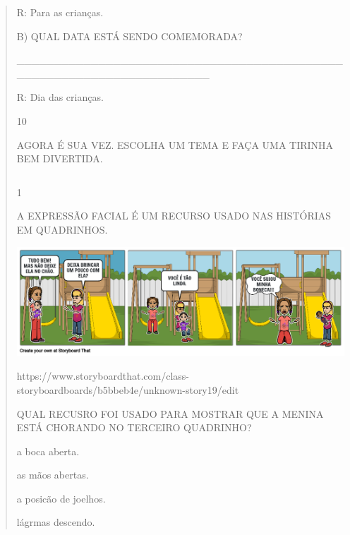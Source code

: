 \begin{verse}
{{{R: Para as crianças.

B) QUAL DATA ESTÁ SENDO COMEMORADA?

\_\_\_\_\_\_\_\_\_\_\_\_\_\_\_\_\_\_\_\_\_\_\_\_\_\_\_\_\_\_\_\_\_\_\_\_\_\_\_\_\_\_\_\_\_\_\_\_\_\_\_\_\_\_\_\_\_\_\_\_\_\_\_\_\_\_\_\_\_\_

R: Dia das crianças.

\num{10}

AGORA É SUA VEZ. ESCOLHA UM TEMA E FAÇA UMA TIRINHA BEM DIVERTIDA.

\begin{longtable}[]{@{}ll@{}}
\toprule
&\tabularnewline
\bottomrule
\end{longtable}


\num{1}

A EXPRESSÃO FACIAL É UM RECURSO USADO NAS HISTÓRIAS EM QUADRINHOS.

\includegraphics[width=4.88436in,height=1.61667in]{media/image136.png}

https://www.storyboardthat.com/class-storyboardboards/b5bbeb4e/unknown-story19/edit

QUAL RECUSRO FOI USADO PARA MOSTRAR QUE A MENINA ESTÁ CHORANDO NO
TERCEIRO QUADRINHO?

\begin{escolha}
\item a boca aberta.

\item as mãos abertas.

\item a posicão de joelhos.

\itemas lágrmas descendo.
\end{escolha}

}}}
\end{verse}
